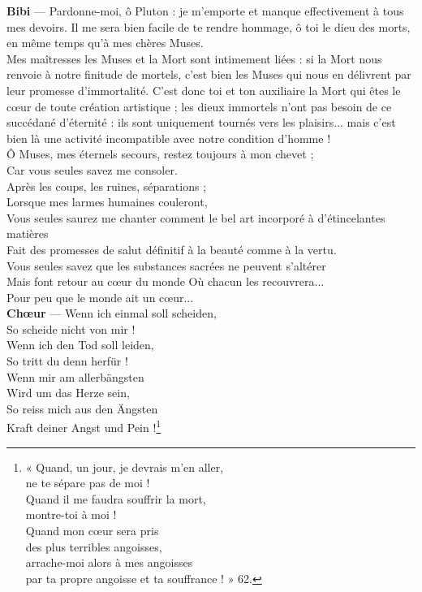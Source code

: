 \documentclass{book}%
\newcommand{\espace}[1]{\hspace{#1}}%
\newcommand{\allemand}[1]{{\policeAll #1}}%
\newlength{\larg}%
\newcommand{\decalageN}[1]{%
\settowidth{\larg}{#1}%
\espace{-\larg}%
}
\newcommand{\perso}[1]{\decalageN{\textbf{#1} --- }\textbf{#1}}%
\newcommand{\note}[1]{\footnote{#1}}
\begin{document}
\perso{Bibi} — Pardonne-moi, ô Pluton : je m'emporte et manque effectivement à tous mes devoirs. Il me sera bien facile de te rendre hommage, ô toi le dieu des morts, en même temps qu'à mes chères Muses. \\
Mes maîtresses les Muses et la Mort sont intimement liées : si la Mort nous renvoie à notre finitude de mortels, c'est bien les Muses qui nous en délivrent par leur promesse d'immortalité. C'est donc toi et ton auxiliaire la Mort qui êtes le cœur de toute création artistique ; les dieux immortels n'ont pas besoin de ce succédané d'éternité : ils sont uniquement tournés vers les plaisirs... mais c'est bien là une activité incompatible avec notre condition d'homme ! \\
Ô Muses, mes éternels secours, restez toujours à mon chevet ; \\
Car vous seules savez me consoler. \\
Après les coups, les ruines, séparations ; \\
Lorsque mes larmes humaines couleront,\\
Vous seules saurez me chanter comment le bel art incorporé à d'étincelantes matières \\
Fait des promesses de salut définitif à la beauté comme à la vertu. \\
Vous seules savez que les substances sacrées ne peuvent s'altérer \\
Mais font retour au cœur du monde Où chacun les recouvrera... \\
Pour peu que le monde ait un cœur... \\

\perso{Chœur} — \allemand{Wenn ich einmal soll scheiden, \\
So scheide nicht von mir ! \\
Wenn ich den Tod soll leiden, \\
So tritt du denn herfür ! \\
Wenn mir am allerbängsten \\
Wird um das Herze sein, \\
So reiss mich aus den Ängsten \\
Kraft deiner Angst und Pein !}\note{« Quand, un jour, je devrais m’en aller, \\
ne te sépare pas de moi ! \\
Quand il me faudra souffrir la mort, \\
montre-toi à moi ! \\
Quand mon cœur sera pris \\
des plus terribles angoisses, \\
arrache-moi alors à mes angoisses \\
par ta propre angoisse et ta souffrance ! » 62.} \\
\end{document}
